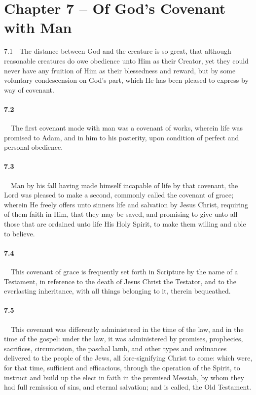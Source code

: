 \section{Chapter 7 -- Of God's Covenant with Man} 7.1\ \ The distance between God and the creature is so great, that although reasonable creatures do owe obedience unto Him as their Creator, yet they could never have any fruition of Him as their blessedness and reward, but by some voluntary condescension on God's part, which He has been pleased to express by way of covenant.   
\bigskip
\paragraph{7.2}\ \ The first covenant made with man was a covenant of works, wherein life was promised to Adam, and in him to his posterity, upon condition of perfect and personal obedience.   
\bigskip
\paragraph{7.3}\ \ Man by his fall having made himself incapable of life by that covenant, the Lord was pleased to make a second, commonly called the covenant of grace; wherein He freely offers unto sinners life and salvation by Jesus Christ, requiring of them faith in Him, that they may be saved, and promising to give unto all those that are ordained unto life His Holy Spirit, to make them willing and able to believe.   
\bigskip
\paragraph{7.4}\ \ This covenant of grace is frequently set forth in Scripture by the name of a Testament, in reference to the death of Jesus Christ the Testator, and to the everlasting inheritance, with all things belonging to it, therein bequeathed.   
\bigskip
\paragraph{7.5}\ \ This covenant was differently administered in the time of the law, and in the time of the gospel: under the law, it was administered by promises, prophecies, sacrifices, circumcision, the paschal lamb, and other types and ordinances delivered to the people of the Jews, all fore-signifying Christ to come: which were, for that time, sufficient and efficacious, through the operation of the Spirit, to instruct and build up the elect in faith in the promised Messiah, by whom they had full remission of sins, and eternal salvation; and is called, the Old Testament.   
\bigskip
